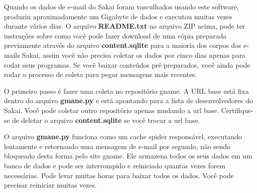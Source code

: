 Quando os dados de e-mail do Sakai foram vasculhados usando este software, 
produziu aproximadamente um Gigabyte de dados e executou muitas vezes 
durante vários dias.
O arquivo {\bf README.txt} no arquivo ZIP acima, pode ter instruções sobre
como você pode fazer download de uma cópia preparada previamente através do
arquivo {\bf content.sqlite} para a maioria dos corpos dos e-mails Sakai, assim
você não precisa coletar os dados por cinco dias apenas para rodar seus programas.
Se você baixar conteúdos pré preparados, você ainda pode rodar o processo de coleta
para pegar mensagens mais recentes.

O primeiro passo é fazer uma coleta no repositório gname. A URL base
está fixa dentro do arquivo {\bf gmane.py} e está apontando para a lista
de desenvolvedores do Sakai. Você pode coletar outro repositório apenas
mudando a url base. Certifique-se de deletar o arquivo {\bf content.sqlite}
se você trocar a url base.

O arquivo {\bf gmane.py} funciona como um cache spider responsável,
executando lentamente e retornando uma mensagem de e-mail por segundo,
não sendo bloqueado desta forma pelo site gname. Ele armazena todos os
seus dados em um banco de dados e pode ser interrompido e reiniciado
quantas vezes forem necessárias. Pode levar muitas horas para baixar
todos os dados. Você pode precisar reiniciar muitas vezes.

